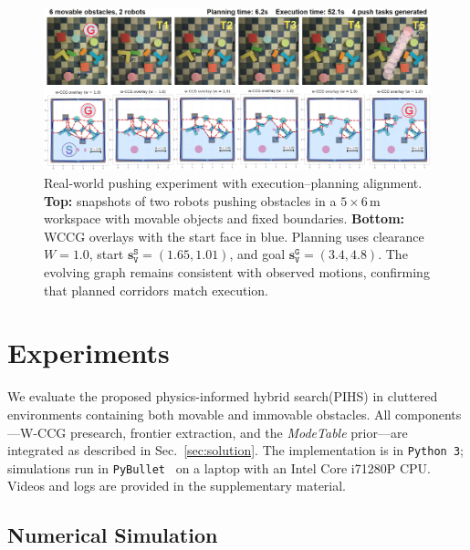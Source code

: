 \begin{figure}[t!]
  \centering
  \includegraphics[width=0.95\linewidth]{figures/hardware_wccg.png}
  \vspace{-4mm}
  \caption{Real-world pushing experiment with execution--planning alignment.
\textbf{Top:} snapshots of two robots pushing obstacles in a \(5{\times}6\,\mathrm{m}\) workspace
with movable objects and fixed boundaries. \textbf{Bottom:} WCCG overlays with the start face in
blue. Planning uses clearance \(W{=}1.0\), start \(\mathbf{s}^{\texttt{S}}_{\texttt{V}}{=}(1.65,1.01)\),
and goal \(\mathbf{s}^{\texttt{G}}_{\texttt{V}}{=}(3.4,4.8)\).
The evolving graph remains consistent with observed motions, confirming that planned corridors
match execution.}
  \vspace{-4mm}
  \label{fig:hardware}
\end{figure}
\section{Experiments}
\label{sec:experiments}
We evaluate the proposed physics-informed hybrid search(PIHS)
in cluttered environments containing both movable
and immovable obstacles. All components—W-CCG presearch, frontier extraction,
and the \textit{ModeTable} prior—are integrated as described in Sec.~\ref{sec:solution}.
The implementation is in \texttt{Python~3};
simulations run in \texttt{PyBullet}~\cite{coumans2019} on a laptop with an Intel Core i7\textendash1280P CPU.
Videos and logs are provided in the supplementary material.



\subsection{Numerical Simulation}
\label{subsec:sim}

